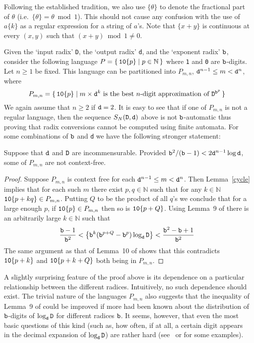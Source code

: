 \documentclass[12pt]{article}
\begin{document}
Following the established tradition, we also use $\{\theta\}$ to
denote the fractional part of $\theta$
(i.e.~$\{\theta\}=\theta\bmod1$). This should not cause any confusion
with the use of $a\{k\}$ as a regular expression for a string of
$a$'s. Note that $\{x+y\}$ is continuous at
every $(x,y)$ such that $(x+y)\bmod 1\not=0$.

Given the `input radix' {\tt D}, the `output radix' {\tt d}, and the
`exponent radix' ${\tt b}$, consider the following language $P=\{\,
{\tt 10}\{p\}\mid p\in {\mathbb N}\,\}$ where {\tt 1} and {\tt 0} are
${\tt b}$-digits.
Let $n \ge 1$ be fixed.
This language can be partitioned into $P_{m,n}$,
${\tt d}^{n-1} \le m <{\tt d}^n$, where 
$$
P_{m,n}=\{\,{\tt 10}\{p\}\mid m\times {\tt d}^k\hbox{ is the
best $n$-digit approximation of ${\tt D}^{{\tt b}^p}$}\,\}
$$
We again assume that $n \ge 2$ if ${\tt d} = 2$.
It is easy to see that if
one of $P_{m,n}$ is not a regular language,
then the sequence $S_N({\tt D},{\tt d})$
above is not ${\tt b}$-automatic thus proving that radix
conversions cannot be computed using finite automata. For some
combinations of ${\tt b}$ and {\tt d} we have the following stronger statement:
\begin{lemma}\label{cling}
Suppose that ${\tt d}$ and ${\tt D}$ are incommensurable.
Provided ${\tt b}^2/({\tt b}-1)<2{\tt
    d}^{n-1}\log{\tt d}$, some of $P_{m,n}$ are not context-free.
\end{lemma}
\begin{proof}Suppose $P_{m,n}$ is context free for each
${\tt d}^{n-1} \le m <{\tt d}^n$.
Then Lemma~\ref{cycle} implies that for
each such $m$ there
exist $p,q\in \mathbb N$ such that for any $k\in\mathbb N$ ${\tt
  10}\{p+kq\}\in P_{m,n}$. Putting $Q$ to be the product of all $q$'s
  we conclude that for a large enough $p$, if ${\tt 10}\{p\}\in P_{m,n}$
  then so is ${\tt 10}\{p+Q\}$. Using Lemma~9 of \cite{Clinger} there
  is an arbitrarily large $k\in\mathbb N$ such that
$$
{\frac{{\tt b}-1}{{\tt b}^2}}<
\left\{{\tt b}^k({\tt b}^{p+Q}-{\tt b}^p)\log_{\tt d}{\tt D}\right\}
<{\frac{{\tt b}^2-{\tt b}+1}{{\tt b}^2}}
$$
The same argument as that of Lemma~10 of \cite{Clinger} shows that
this contradicts ${\tt 10}\{p+k\}$ and ${\tt 10}\{p+k+Q\}$ both being
in $P_{m,n}$.
\end{proof}

A slightly surprising feature of the proof above is its dependence on
a particular relationship between the different 
radices. Intuitively, no such dependence should exist. The
trivial nature of the languages $P_{m,n}$ also suggests that the
inequality of Lemma~9 of \cite{Clinger} could be improved if more had been
known about the distribution of ${\tt b}$-digits of $\log_{\tt d}{\tt D}$ for
different radices ${\tt b}$. It seems, however, that even the most basic
questions of this kind (such as, how often, if at all, a certain
digit appears in the decimal expansion of $\log_{\tt d}{\tt D}$) are rather
hard (see~\cite{Allouche} or \cite{Hardy} for some examples).
\end{document}
